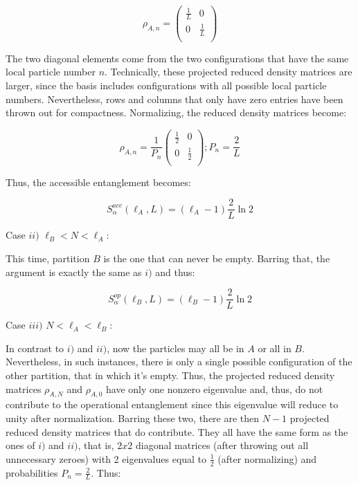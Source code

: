 \begin{equation}
\rho_{A,n} = \begin{pmatrix} 

\frac{1}{L} & 0 \\
0 & \frac{1}{L} \\

\end{pmatrix}
\end{equation}

The two diagonal elements come from the two configurations that have the same local particle number $n$. Technically, these projected reduced density matrices are larger, since the basis includes configurations with all possible local particle numbers. Nevertheless, rows and columns that only have zero entries have been thrown out for compactness. Normalizing, the reduced density matrices become:

\begin{equation}
\rho_{A,n} = \frac{1}{P_n} \begin{pmatrix} 

\frac{1}{2} & 0 \\
0 & \frac{1}{2} \\

\end{pmatrix} ; P_n = \frac{2}{L}
\end{equation}

Thus, the accessible entanglement becomes:

\begin{equation}
S_{\alpha}^{acc} (\ell_A, L) = (\ell_{A} - 1) \frac{2}{L} \ln{2}
\end{equation}

Case $ii)$ $\ell_{B} < N < \ell_{A}$:

This time, partition $B$ is the one that can never be empty. Barring that, the argument is exactly the same as $i)$ and thus:

\begin{equation}
S_{\alpha}^{op} (\ell_{B}, L) = (\ell_{B} - 1) \frac{2}{L} \ln{2}
\end{equation}

Case $iii)$ $N < \ell_{A} < \ell_{B}$:

In contrast to $i)$ and $ii)$, now the particles may all be in $A$ or all in $B$. Nevertheless, in such instances, there is only a single possible configuration of the other partition, that in which it's empty. Thus, the projected reduced density matrices $\rho_{A,N}$ and $\rho_{A,0}$ have only one nonzero eigenvalue and, thus, do not contribute to the operational entanglement since this eigenvalue will reduce to unity after normalization. Barring these two, there are then $N-1$ projected reduced density matrices that do contribute. They all have the same form as the ones of $i)$ and $ii)$, that is, $2x2$ diagonal matrices (after throwing out all unnecessary zeroes) with 2 eigenvalues equal to $\frac{1}{2}$ (after normalizing) and probabilities $P_n = \frac{2}{L}$. Thus:

